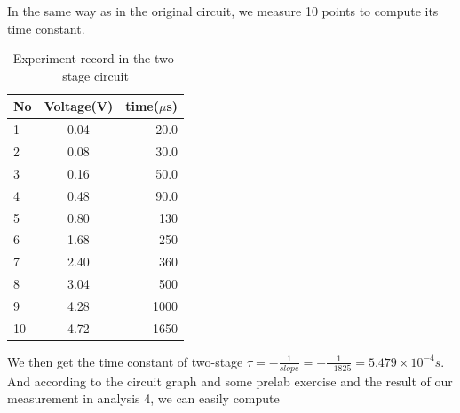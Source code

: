\phantom{ } In the same way as in the original circuit, we measure 10 points to compute its time constant.
\begin{table}[!htbp]\centering
	\caption{Experiment record in the two-stage circuit}
	\renewcommand\arraystretch{1.5}
	\begin{tabular}{lcr}
		\toprule
		No		&Voltage(V)	&time($\mu$s)	\\
		\midrule
		1		&0.04		&20.0		\\

		2		&0.08		&30.0		\\
		
		3		&0.16		&50.0		\\
		
		4		&0.48		&90.0		\\
		
		5		&0.80		&130		\\
		
		6		&1.68		&250		\\
		
		7		&2.40		&360		\\
		
		8		&3.04		&500		\\
		
		9		&4.28		&1000		\\
		
		10		&4.72		&1650		\\
		\bottomrule
	\end{tabular}
\end{table}
\phantom{ } We then get the time constant of two-stage 
$\tau = -\frac{1}{slope} = -\frac{1}{-1825} = 5.479\times10^{-4}s $.\\ And according to the circuit graph and some prelab exercise and the result of our measurement in analysis 4, we can easily compute
